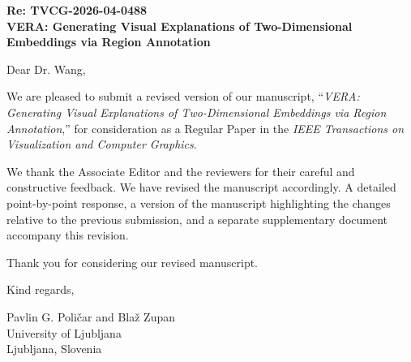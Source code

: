 \documentclass[11pt]{article}
\begin{document}
\onehalfspacing
\setlength{\parskip}{3mm}
\thispagestyle{empty}

\noindent\textbf{Re: TVCG-2026-04-0488}\\
\textbf{VERA: Generating Visual Explanations of Two-Dimensional Embeddings via Region Annotation}

\vspace{6mm}

\noindent Dear Dr. Wang,

\noindent We are pleased to submit a revised version of our manuscript,
``\textit{VERA: Generating Visual Explanations of Two-Dimensional Embeddings
via Region Annotation},'' for consideration as a Regular Paper in the
\textit{IEEE Transactions on Visualization and Computer Graphics}.

\noindent We thank the Associate Editor and the reviewers for their careful
and constructive feedback. We have revised the manuscript accordingly. A
detailed point-by-point response, a version of the manuscript highlighting
the changes relative to the previous submission, and a separate supplementary
document accompany this revision.


\noindent Thank you for considering our revised manuscript.

\vspace{5mm}

\noindent Kind regards,

\vspace{3mm}

\noindent Pavlin G. Poli\v{c}ar and Bla\v{z} Zupan\\
University of Ljubljana\\
Ljubljana, Slovenia
\end{document}
